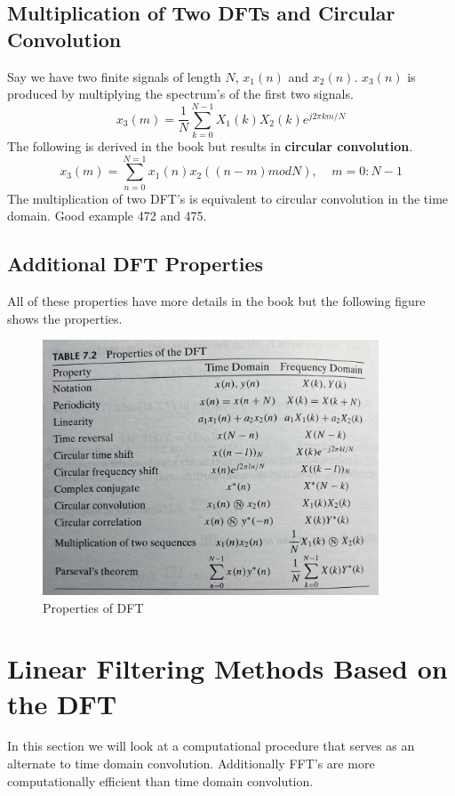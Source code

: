 \documentclass{article} %
\begin{document}
	\subsection{Multiplication of Two DFTs and Circular Convolution}
	Say we have two finite signals of length $N$, $x_1(n)$ and $x_2(n)$. $x_3(n)$ is produced by multiplying the spectrum's of the first two signals. 
	\begin{equation}
	x_3(m) = \frac{1}{N} \sum_{k=0}^{N-1} X_1(k)X_2(k)e^{j2\pi km/N}
	\end{equation}
	The following is derived in the book but results in \textbf{circular convolution}.
	\begin{equation}
	x_3(m) = \sum_{n=0}^{N=1}x_1(n)x_2((n-m) mod N), \;\;\;\; m = 0:N-1
	\end{equation}
	The multiplication of two DFT's is equivalent to circular convolution in the time domain. Good example 472 and 475.
	
	\subsection{Additional DFT Properties}
	All of these properties have more details in the book but the following figure shows the properties. 
	
	\begin{figure}[h]
	\centering
	\includegraphics[width=10cm]{prop_dft}
	\caption{Properties of DFT}
	\end{figure}
	
	\section{Linear Filtering Methods Based on the DFT}
	In this section we will look at a computational procedure that serves as an alternate to time domain convolution. Additionally FFT's are more computationally efficient than time domain convolution. 
\end{document}
